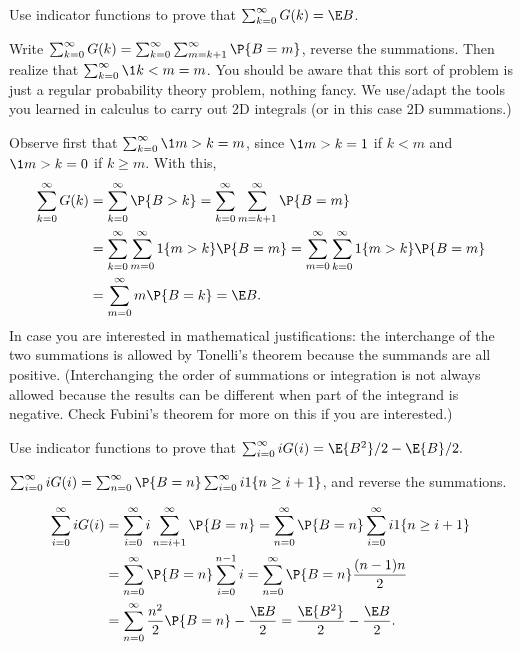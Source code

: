 \begin{exercise}\label{ex:6}
 Use indicator functions to prove that $ \sum_{k=0}^\infty G(k) = \E B$.
    \begin{hint}
Write 
$\sum_{k=0}^\infty G(k) = \sum_{k=0}^\infty \sum_{m=k+1}^\infty \P{B=m}$, reverse the summations. Then realize that $\sum_{k=0}^\infty \1{k<m} = m$. 
You should be aware that this sort of problem is just a regular probability
  theory problem, nothing fancy. We use/adapt the tools you learned in
  calculus to carry out 2D integrals (or in this case 2D summations.)
    \end{hint}
\begin{solution}
Observe first that $\sum_{k=0}^\infty \1{m>k} = m$, since $\1{m>k}=1$ if $k<m$ and $\1{m>k} = 0$ if $k\geq m$. With this, 
\begin{align*}
\sum_{k=0}^\infty G(k) 
&= \sum_{k=0}^\infty \P{B>k} 
= \sum_{k=0}^\infty \sum_{m=k+1}^\infty \P{B=m}  \\
& = \sum_{k=0}^\infty \sum_{m=0}^\infty 1\{m>k\} \P{B=m} 
= \sum_{m=0}^\infty \sum_{k=0}^\infty 1 \{m>k\} \P{B=m} \\
&= \sum_{m=0}^\infty m\P{B=k} = \E B.
\end{align*}
In case you are interested in mathematical justifications: the
interchange of the two summations is allowed by Tonelli's theorem because the summands are
all positive. (Interchanging the order of summations or integration is
not always allowed because the results can be different when part of
the integrand is negative. Check Fubini's theorem for more on this if
you are interested.)
\end{solution}
\end{exercise}

\begin{exercise}\label{ex:66}
 Use indicator functions to prove that
$\sum_{i=0}^\infty i G(i) =  \E{B^2}/2 - \E{B}/2.$
    \begin{hint}
$\sum_{i=0}^\infty i G(i) = \sum_{n=0}^\infty \P{B=n} \sum_{i=0}^\infty i 1\{n\geq i+1\}$,
and reverse the summations.
    \end{hint}
\begin{solution}
\begin{align*}
\sum_{i=0}^\infty i G(i)
&= \sum_{i=0}^\infty i \sum_{n=i+1}^\infty \P{B=n} = \sum_{n=0}^\infty \P{B=n} \sum_{i=0}^\infty i 1\{n\geq i+1\} \\
&= \sum_{n=0}^\infty \P{B=n} \sum_{i=0}^{n-1}i  = \sum_{n=0}^\infty \P{B=n} \frac{(n-1)n}{2} \\
&= \sum_{n=0}^\infty  \frac{n^2}{2} \P{B=n} - \frac{\E B}{2}
= \frac{\E{B^2}}{2} - \frac{\E B}{2}.
\end{align*}
\end{solution}
\end{exercise}


